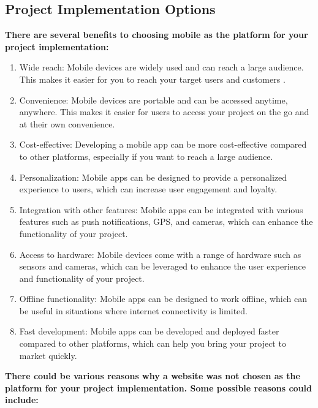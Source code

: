 \documentclass[12pt]{article}
\begin{document}
		\subsection{Project Implementation Options}
			\textbf{There are several benefits to choosing mobile as the platform for your project implementation:}
			\begin{enumerate}
				\item Wide reach: Mobile devices are widely used and can reach a large audience. This makes it easier for you to reach your target users and customers \cite{usingsmartphone}.
				\item Convenience: Mobile devices are portable and can be accessed anytime, anywhere. This makes it easier for users to access your project on the go and at their own convenience\cite{schadler2012mobile}.
				\item Cost-effective: Developing a mobile app can be more cost-effective compared to other platforms, especially if you want to reach a large audience.
				\item Personalization: Mobile apps can be designed to provide a personalized experience to users, which can increase user engagement and loyalty.
				\item Integration with other features: Mobile apps can be integrated with various features such as push notifications, GPS, and cameras, which can enhance the functionality of your project.
				\item Access to hardware: Mobile devices come with a range of hardware such as sensors and cameras, which can be leveraged to enhance the user experience and functionality of your project.
				\item Offline functionality: Mobile apps can be designed to work offline, which can be useful in situations where internet connectivity is limited.
				\item Fast development: Mobile apps can be developed and deployed faster compared to other platforms, which can help you bring your project to market quickly.
			\end{enumerate}
			\textbf{There could be various reasons why a website was not chosen as the platform for your project implementation. Some possible reasons could include:}
\end{document}
